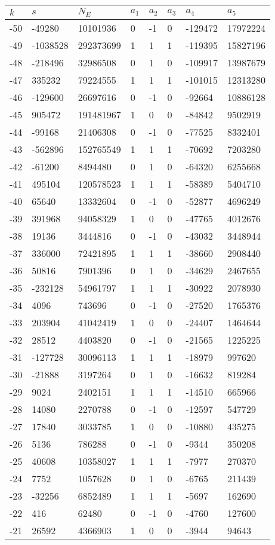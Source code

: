 \documentclass{amsart}
\begin{document}
\begin{longtable}{|l|l|l|lllll|}
\hline
$k$ & $s$ & $N_E$ & $a_1$ & $a_2$ & $a_3$ & $a_4$ & $a_5$\\
\hline
-50&-49280&10101936&0&-1&0&-129472&17972224\\
-49&-1038528&292373699&1&1&1&-119395&15827196\\
-48&-218496&32986508&0&1&0&-109917&13987679\\
-47&335232&79224555&1&1&1&-101015&12313280\\
-46&-129600&26697616&0&-1&0&-92664&10886128\\
-45&905472&191481967&1&0&0&-84842&9502919\\
-44&-99168&21406308&0&-1&0&-77525&8332401\\
-43&-562896&152765549&1&1&1&-70692&7203280\\
-42&-61200&8494480&0&1&0&-64320&6255668\\
-41&495104&120578523&1&1&1&-58389&5404710\\
-40&65640&13332604&0&-1&0&-52877&4696249\\
-39&391968&94058329&1&0&0&-47765&4012676\\
-38&19136&3444816&0&-1&0&-43032&3448944\\
-37&336000&72421895&1&1&1&-38660&2908440\\
-36&50816&7901396&0&1&0&-34629&2467655\\
-35&-232128&54961797&1&1&1&-30922&2078930\\
-34&4096&743696&0&-1&0&-27520&1765376\\
-33&203904&41042419&1&0&0&-24407&1464644\\
-32&28512&4403820&0&-1&0&-21565&1225225\\
-31&-127728&30096113&1&1&1&-18979&997620\\
-30&-21888&3197264&0&1&0&-16632&819284\\
-29&9024&2402151&1&1&1&-14510&665966\\
-28&14080&2270788&0&-1&0&-12597&547729\\
-27&17840&3033785&1&0&0&-10880&435275\\
-26&5136&786288&0&-1&0&-9344&350208\\
-25&40608&10358027&1&1&1&-7977&270370\\
-24&7752&1057628&0&1&0&-6765&211439\\
-23&-32256&6852489&1&1&1&-5697&162690\\
-22&416&62480&0&-1&0&-4760&127600\\
-21&26592&4366903&1&0&0&-3944&94643\\

\end{longtable}
\end{document}
